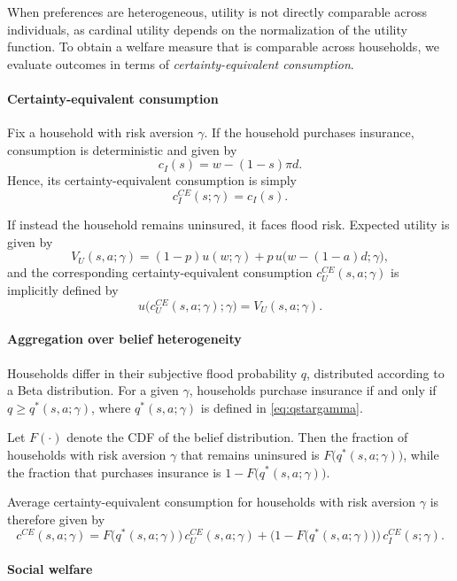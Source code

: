 \documentclass[12pt]{article}
\begin{document}
When preferences are heterogeneous, utility is not directly comparable across individuals, as cardinal utility depends on the normalization of the utility function. To obtain a welfare measure that is comparable across households, we evaluate outcomes in terms of \emph{certainty-equivalent consumption}.

\paragraph{Certainty-equivalent consumption}

Fix a household with risk aversion $\gamma$. If the household purchases insurance, consumption is deterministic and given by
\[
c_I(s) = w - (1-s)\pi d.
\]
Hence, its certainty-equivalent consumption is simply
\[
c_I^{CE}(s;\gamma) = c_I(s).
\]

If instead the household remains uninsured, it faces flood risk. Expected utility is given by
\[
V_U(s,a;\gamma) = (1-p)u(w;\gamma) + p\,u\bigl(w-(1-a)d;\gamma\bigr),
\]
and the corresponding certainty-equivalent consumption $c_U^{CE}(s,a;\gamma)$ is implicitly defined by
\[
u\bigl(c_U^{CE}(s,a;\gamma);\gamma\bigr) = V_U(s,a;\gamma).
\]

\paragraph{Aggregation over belief heterogeneity}

Households differ in their subjective flood probability $q$, distributed according to a Beta distribution. For a given $\gamma$, households purchase insurance if and only if $q \geq q^*(s,a;\gamma)$, where $q^*(s,a;\gamma)$ is defined in \eqref{eq:qstargamma}. 

Let $F(\cdot)$ denote the CDF of the belief distribution. Then the fraction of households with risk aversion $\gamma$ that remains uninsured is $F\bigl(q^*(s,a;\gamma)\bigr)$, while the fraction that purchases insurance is $1 - F\bigl(q^*(s,a;\gamma)\bigr)$.

Average certainty-equivalent consumption for households with risk aversion $\gamma$ is therefore given by
\[
c^{CE}(s,a;\gamma)
=
F\bigl(q^*(s,a;\gamma)\bigr)\, c_U^{CE}(s,a;\gamma)
+
\bigl(1 - F\bigl(q^*(s,a;\gamma)\bigr)\bigr)\, c_I^{CE}(s;\gamma).
\]

\paragraph{Social welfare}
\end{document}
